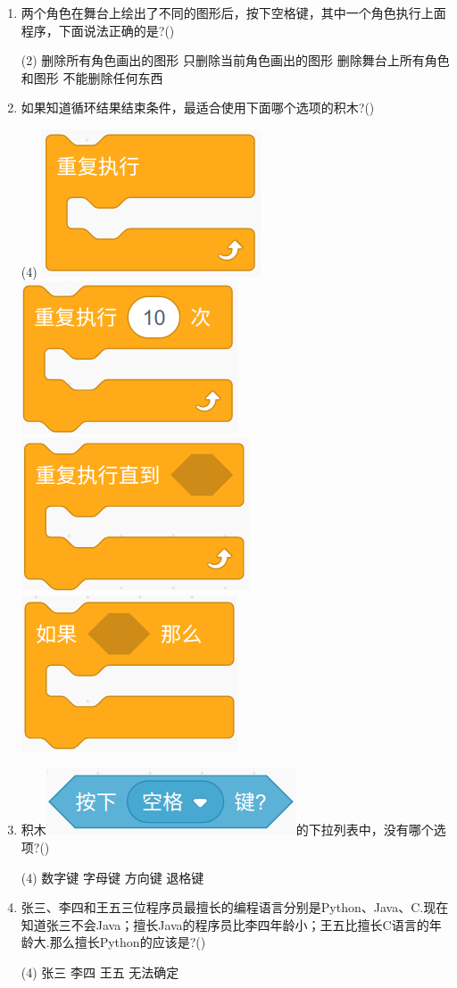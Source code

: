 \documentclass[10pt, a4paper]{article}
\begin{document}
\begin{enumerate}
        \item 两个角色在舞台上绘出了不同的图形后，按下空格键，其中一个角色执行上面程序，下面说法正确的是?(\qquad)
        \begin{tasks}(2)
            \task 删除所有角色画出的图形
            \task 只删除当前角色画出的图形
            \task 删除舞台上所有角色和图形
            \task 不能删除任何东西
        \end{tasks}

        \newpage
        \item 如果知道循环结果结束条件，最适合使用下面哪个选项的积木?(\qquad)
        \begin{tasks}(4)
            \task \includegraphics[width=.12\textwidth]{15a.png}
            \task \includegraphics[width=.12\textwidth]{15b.png}
            \task \includegraphics[width=.12\textwidth]{15c.png}
            \task \includegraphics[width=.12\textwidth]{15d.png}
        \end{tasks}

        \item 积木\includegraphics[width=.15\textwidth]{16.png}的下拉列表中，没有哪个选项?(\qquad)
        \begin{tasks}(4)
            \task 数字键
            \task 字母键
            \task 方向键
            \task 退格键
        \end{tasks}

        \item 张三、李四和王五三位程序员最擅长的编程语言分别是Python、Java、C.现在知道张三不会Java；擅长Java的程序员比李四年龄小；王五比擅长C语言的年龄大.那么擅长Python的应该是?(\qquad)
        \begin{tasks}(4)
            \task 张三
            \task 李四
            \task 王五
            \task 无法确定
        \end{tasks}


\end{enumerate}
\end{document}
